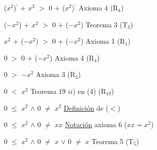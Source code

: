 \documentclass[12pt]{article}
\begin{document}
($x^{2}$){\LARGE{$^{\prime}$}} $+$ $x^{2}$ $>$ $0$ $+$ ($x^{2}$){\LARGE{$^{\prime}$}} \hspace{4.8cm} {\textcolor{carrotorange}{Axioma 4 (R$_{4}$)}} \vspace{0.5cm}

($-x^{2}$) $+$ $x^{2}$ $>$ $0$ $+$ ($-x^{2}$) \hspace{4.4cm} {\textcolor{carrotorange}{Teorema 3 (T$_{3}$)}} \vspace{0.5cm}

$x^{2}$ $+$ ($-x^{2}$) $>$ $0$ $+$ ($-x^{2}$) \hspace{4.3cm} {\textcolor{carrotorange}{Axioma 1 (R$_{1}$)}} \vspace{0.5cm}

$0$ $>$ $0$ $+$ ($-x^{2}$) \hspace{6.5cm} {\textcolor{carrotorange}{Axioma 4 (R$_{4}$)}} \vspace{0.5cm}

$0$ $>$ $-x^{2}$ \hspace{7.8cm} {\textcolor{carrotorange}{Axioma 3 (R$_{3}$)}} \vspace{0.5cm}

$0$ $<$ $x^{2}$ \hspace{7cm} {\textcolor{carrotorange}{Teorema 19 $ii$) en (4) (R$_{19}$)}} \vspace{0.5cm}

$0$ $\leq$ $x^{2}$ \hspace{0.2cm} $\wedge$ \hspace{0.2cm} $0$ $\neq$ $x^{2}$ \hspace{5.3cm} {\textcolor{carrotorange}{{\underline{Definición}} de ($<$)}} \vspace{0.5cm}

$0$ $\leq$ $x^{2}$ \hspace{0.2cm} $\wedge$ \hspace{0.2cm} $0$ $\neq$ $xx$ \hspace{4cm} {\textcolor{carrotorange}{{\underline{Notación}} axioma 6 ($xx=x^{2}$)}} \vspace{0.5cm}

$0$ $\leq$ $x^{2}$ \hspace{0.2cm} $\wedge$ \hspace{0.2cm} $0$ $\neq$ $x$ \hspace{0.2cm} $\vee$ \hspace{0.2cm} $0$ $\neq$ $x$ \hspace{3cm} {\textcolor{carrotorange}{Teorema 5  (T$_{5}$)}} \vspace{0.5cm}
\end{document}
